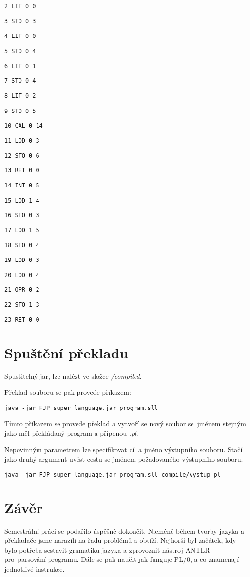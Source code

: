\documentclass[czech]{thesiskiv}
\begin{document}
\texttt{2	LIT	0	0             }

\texttt{3	STO	0	3            }

\texttt{4	LIT	0	0           }

\texttt{5	STO	0	4          }

\texttt{6	LIT	0	1         }

\texttt{7	STO	0	4        }

\texttt{8	LIT	0	2       }

\texttt{9	STO	0	5      }

\texttt{10	CAL	0	14  }

\texttt{11	LOD	0	3  }

\texttt{12	STO	0	6 }

\texttt{13	RET	0	0         }

\texttt{14	INT	0	5        }

\texttt{15	LOD	1	4       }

\texttt{16	STO	0	3      }

\texttt{17	LOD	1	5     }

\texttt{18	STO	0	4    }

\texttt{19	LOD	0	3   }

\texttt{20	LOD	0	4  }

\texttt{21	OPR	0	2 }

\texttt{22	STO	1	3}

\texttt{23	RET	0	0}

\chapter{Spuštění překladu}
Spustitelný jar, lze nalézt ve složce \textit{/compiled}.

\noindent Překlad souboru se pak provede příkazem:

   \texttt{java -jar FJP\_{super}\_{language}.jar program.sll}
   
\noindent Tímto příkazem se provede překlad a vytvoří se nový soubor se~jménem stejným jako měl překládaný program a příponou \textit{.pl}.  

\noindent Nepovinným parametrem lze specifikovat cíl a jméno výstupního souboru. Stačí jako druhý argument uvést cestu se jménem požadovaného výstupního souboru.

  \texttt{java -jar FJP\_{super}\_{language}.jar program.sll compile/vystup.pl}

\chapter{Závěr}
Semestrální práci se podařilo úspěšně dokončit. Nicméně během tvorby jazyka a překladače
jsme narazili na řadu problémů a obtíží. Nejhorší byl začátek, kdy bylo potřeba sestavit gramatiku jazyka
a zprovoznit nástroj ANTLR pro~parsování programu. Dále se pak naučit jak funguje PL/0, a co znamenají jednotlivé instrukce.
\end{document}
